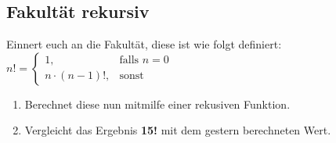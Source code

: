 \subsection{Fakultät rekursiv }
Einnert euch an die Fakultät, diese ist wie folgt definiert:
$n! =\left\{\begin{array}{cl} 1, & \mbox{falls }  n = 0 \\ n \cdot(n-1)!, & \mbox{sonst} \end{array}\right.$
\begin{enumerate}
    \item Berechnet diese nun mitmilfe einer rekusiven Funktion.
    \item Vergleicht das Ergebnis \textbf{15!} mit dem gestern berechneten Wert.
\end{enumerate}
